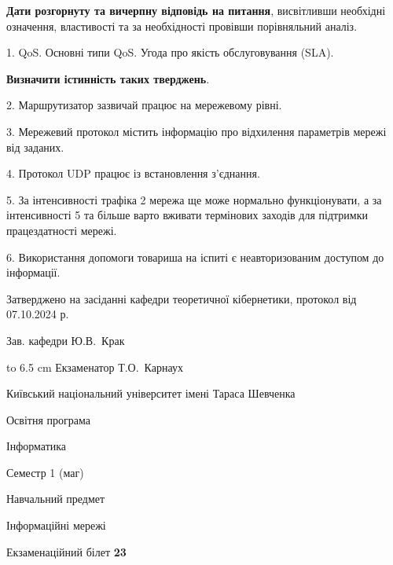 \documentclass[12pt, ukrainian]{article}
\begin{document}
{
\qquad\textbf{Дати розгорнуту та вичерпну відповідь на питання}, висвітливши необхідні означення, властивості та за необхідності провівши порівняльний аналіз.

1. QoS. Основні типи QoS. Угода про якість обслуговування (SLA).



\qquad\textbf{Визначити істинність таких тверджень}.

2. Маршрутизатор зазвичай працює на мережевому рівні.


3. Мережевий протокол містить інформацію про відхилення параметрів мережі від заданих.


4. Протокол UDP працює із встановлення з'єднання.


5. За інтенсивності трафіка 2 мережа ще може нормально функціонувати, а за інтенсивності 5 та більше варто вживати термінових заходів для підтримки працездатності мережі.


6. Використання допомоги товариша на іспиті є неавторизованим доступом до інформації.

}
{\smallskip\smallskip \begin {scriptsize} Затверджено на засіданні кафедри теоретичної кібернетики, протокол   від   07.10.2024 р.\par\smallskip\smallskip\smallskip\smallskip
{\parbox {6.5 cm} {Зав. кафедри \dotfill Ю.В.~Крак}}\hspace {0.7cm} {\hbox to 6.5 cm { Екзаменатор \dotfill Т.О.~Карнаух}} \end{scriptsize}}
\vspace{0.9cm}
{{\begin {scriptsize}\par
{ \center  Київський національний університет імені Тараса Шевченка \par}
{\parbox {5 cm}{Освітня програма \hfill}{\parbox {7 cm}{Інформатика\hfill}}\parbox {6 cm}{\hfill Семестр 1 (маг)}}\par
{\parbox {5 cm} {Навчальний предмет \hfill}\parbox {7 cm}{Інформаційні мережі \hfill}\parbox {6cm}{\hfill}\par}\vspace{-15pt} \end{scriptsize}}{\center Екзаменаційний білет \No \textbf { 23 }\par}}
\end{document}
